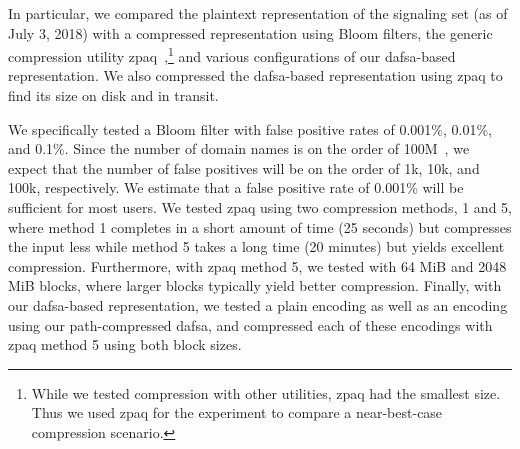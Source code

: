 In particular, we compared the plaintext representation of the signaling set (as
of July 3, 2018) with a compressed representation using Bloom filters, the
generic compression utility zpaq~\cite{zpaq},\footnote{While we tested
  compression with other utilities, zpaq had the smallest size. Thus we used
zpaq for the experiment to compare a near-best-case compression scenario.} and
various configurations of our \ac{dafsa}-based representation. We also
compressed the \ac{dafsa}-based representation using zpaq to find its size on
disk and in transit. 

We specifically tested a Bloom filter with false positive rates of 0.001\%,
0.01\%, and 0.1\%. Since the number of domain names is on the order of
100M~\cite{dnib-14-1}, we expect that the number of false positives will be on
the order of 1k, 10k, and 100k, respectively. We estimate that a false positive
rate of 0.001\% will be sufficient for most users. We tested zpaq using two
compression methods, 1 and 5, where method 1 completes in a short amount of time
(25 seconds) but compresses the input less while method 5 takes a long time (20
minutes) but yields excellent compression. Furthermore, with zpaq method 5, we
tested with 64 MiB and 2048 MiB blocks, where larger blocks typically yield
better compression. Finally, with our \ac{dafsa}-based representation, we tested
a plain encoding as well as an encoding using our path-compressed \ac{dafsa},
and compressed each of these encodings with zpaq method 5 using both block
sizes.



